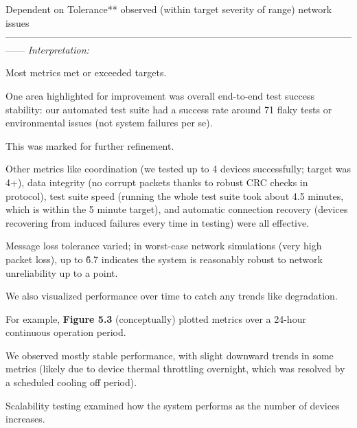{{{{Dependent on Tolerance** observed (within target severity of range) network issues
------------------------------------------------------------------------------------------------------------------
\textit{Interpretation:}

Most metrics met or exceeded targets.

One area highlighted for improvement was overall end-to-end test success stability:
our automated test suite had a success rate around 71%
flaky tests or environmental issues (not system failures per se).

This was marked for further refinement.

Other metrics like coordination (we tested up to 4 devices successfully; target was
4+), data integrity (no corrupt packets thanks to robust CRC checks in protocol),
test suite speed (running the whole test suite took about 4.5 minutes, which is
within the 5 minute target), and automatic connection recovery (devices recovering
from induced failures every time in testing) were all effective.

Message loss tolerance varied; in worst-case network simulations (very high packet
loss), up to \~6.7%
indicates the system is reasonably robust to network unreliability up to a point.

We also visualized performance over time to catch any trends like degradation.

For example, \textbf{Figure 5.3}
 (conceptually) plotted metrics over a 24-hour continuous operation period.

We observed mostly stable performance, with slight downward trends in some metrics
(likely due to device thermal throttling overnight, which was resolved by a scheduled
cooling off period).

Scalability testing examined how the system performs as the number of devices
increases.

}}}}
